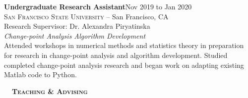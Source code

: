 \documentclass[hidelinks, 10.5pt]{article}
\def\contentwidth{0.9\linewidth}    %
\def\contentblockspacing{2.5mm}     %
\def\contentheaderspacing{1mm}      %
\def\sectionspacing{8mm}            %
\def\sectiontocontentspacing{4mm}   %
\renewcommand{\section}[1]{
    {\fontsize{14}{14}\selectfont \textsc{\textbf{\ \ #1\ \ }}}\hrulefill
}
\begin{document}
{{    \vspace{\contentblockspacing}


    \begin{minipage}[ct]{\contentwidth}
        \textbf{Undergraduate Research Assistant}\hfill Nov 2019 to Jan 2020\\
        \textsc{San Francisco State University} -- San Francisco, CA\\
        Research Supervisor: Dr. Alexandra Piryatinska
        \vspace{\contentheaderspacing}\\
        {\textit{Change-point Analysis Algorithm Development}}\\
        Attended workshops in numerical methods and statistics theory in preparation for research in change-point analysis and algorithm
        development.  Studied completed change-point analysis research and began work on adapting existing Matlab code to Python.
    \end{minipage}
}

\vspace{\sectionspacing}


\section{Teaching \& Advising}

\vspace{\sectiontocontentspacing}

}
\end{document}
